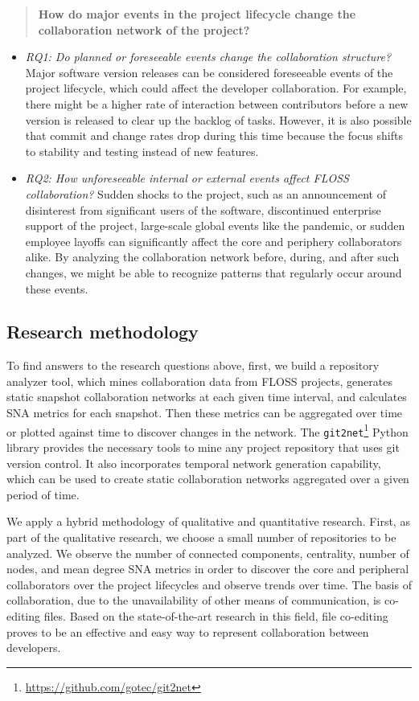 \begin{quote}
    \textbf{How do major events in the project lifecycle change the collaboration network of the project?}
\end{quote}
\begin{itemize}
    \item \textit{RQ1: Do planned or foreseeable events change the collaboration structure?} Major software version releases can be considered foreseeable events of the project lifecycle, which could affect the developer collaboration. For example, there might be a higher rate of interaction between contributors before a new version is released to clear up the backlog of tasks. However, it is also possible that commit and change rates drop during this time because the focus shifts to stability and testing instead of new features.
    \item \textit{RQ2: How unforeseeable internal or external events affect FLOSS collaboration?} Sudden shocks to the project, such as an announcement of disinterest from significant users of the software, discontinued enterprise support of the project, large-scale global events like the pandemic, or sudden employee layoffs can significantly affect the core and periphery collaborators alike. By analyzing the collaboration network before, during, and after such changes, we might be able to recognize patterns that regularly occur around these events.
\end{itemize}

\subsection{Research methodology}
To find answers to the research questions above, first, we build a repository analyzer tool, which mines collaboration data from FLOSS projects, generates static snapshot collaboration networks at each given time interval, and calculates SNA metrics for each snapshot. Then these metrics can be aggregated over time or plotted against time to discover changes in the network. The \texttt{git2net}\footnote{\url{https://github.com/gotec/git2net}} \cite{goteAnalysingTimeStampedCoEditing2019} Python library provides the necessary tools to mine any project repository that uses git version control. It also incorporates temporal network generation capability, which can be used to create static collaboration networks aggregated over a given period of time.


We apply a hybrid methodology of qualitative and quantitative research. First, as part of the qualitative research, we choose a small number of repositories to be analyzed. We observe the number of connected components, centrality, number of nodes, and mean degree SNA metrics in order to discover the core and peripheral collaborators over the project lifecycles and observe trends over time. The basis of collaboration, due to the unavailability of other means of communication, is co-editing files. Based on the state-of-the-art research in this field, file co-editing proves to be an effective and easy way to represent collaboration between developers.

